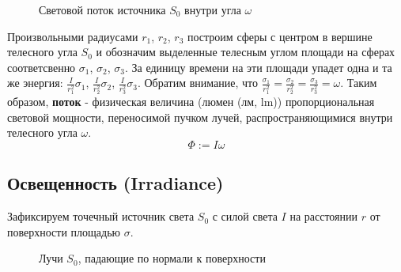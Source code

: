 \documentclass[12pt]{article}
\begin{document}
\begin{figure}[h]
\begin{center}
    \caption{Световой поток источника $S_0$ внутри угла $\omega$}
  \end{center}
\end{figure}

Произвольными радиусами $r_1$, $r_2$, $r_3$ построим сферы с центром в вершине
телесного угла $S_0$ и обозначим выделенные телесным углом площади на сферах соответсвенно
$\sigma_1$, $\sigma_2$, $\sigma_3$. За единицу времени на эти площади упадет одна и та
же энергия: $\frac{I}{r_1^2}\sigma_1$, $\frac{I}{r_2^2}\sigma_2$, $\frac{I}{r_3^2}\sigma_3$.
Обратим внимание, что $\frac{\sigma_1}{r_1^2}=\frac{\sigma_2}{r_2^2}=\frac{\sigma_3}{r_3^2}=\omega$.
Таким образом, \textbf{поток} - физическая величина (люмен (лм, lm)) пропорциональная световой мощности,
переносимой пучком лучей, распространяющимися внутри телесного угла $\omega$.
\[\Phi:=I\omega\]

\subsection{Освещенность (Irradiance)}

Зафиксируем точечный источник света $S_0$ с силой света $I$ на расстоянии $r$ от поверхности площадью $\sigma$.
\begin{figure}[h]
  \begin{center}
    \caption{Лучи $S_0$, падающие по нормали к поверхности}
  \end{center}
\end{figure}
\end{document}

